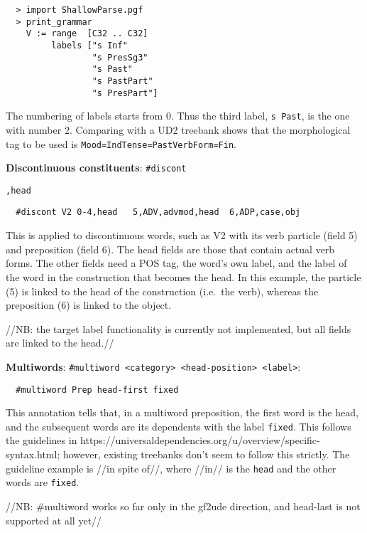 \begin{verbatim}
  > import ShallowParse.pgf
  > print_grammar
    V := range  [C32 .. C32]
         labels ["s Inf"
                 "s PresSg3"
                 "s Past"
                 "s PastPart"
                 "s PresPart"]
\end{verbatim}

The numbering of labels starts from 0. Thus the third label,
\texttt{s\ Past}, is the one with number 2. Comparing with a UD2
treebank shows that the morphological tag to be used is
\texttt{Mood=Ind\textbar{}Tense=Past\textbar{}VerbForm=Fin}.

\textbf{Discontinuous constituents}: \texttt{\#discont}

\texttt{,head}

\begin{verbatim}
  #discont V2 0-4,head   5,ADV,advmod,head  6,ADP,case,obj
\end{verbatim}

This is applied to discontinuous words, such as V2 with its verb
particle (field 5) and preposition (field 6). The head fields are those
that contain actual verb forms. The other fields need a POS tag, the
word's own label, and the label of the word in the construction that
becomes the head. In this example, the particle (5) is linked to the
head of the construction (i.e.~the verb), whereas the preposition (6) is
linked to the object.

//NB: the target label functionality is currently not implemented, but
all fields are linked to the head.//

\textbf{Multiwords}:
\texttt{\#multiword\ \textless{}category\textgreater{}\ \textless{}head-position\textgreater{}\ \textless{}label\textgreater{}}:

\begin{verbatim}
  #multiword Prep head-first fixed
\end{verbatim}

This annotation tells that, in a multiword preposition, the first word
is the head, and the subsequent words are its dependents with the label
\texttt{fixed}. This follows the guidelines in
https://universaldependencies.org/u/overview/specific-syntax.html;
however, existing treebanks don't seem to follow this strictly. The
guideline example is //in spite of//, where //in// is the \texttt{head}
and the other words are \texttt{fixed}.

//NB: \#multiword works so far only in the gf2ude direction, and
head-last is not supported at all yet//

